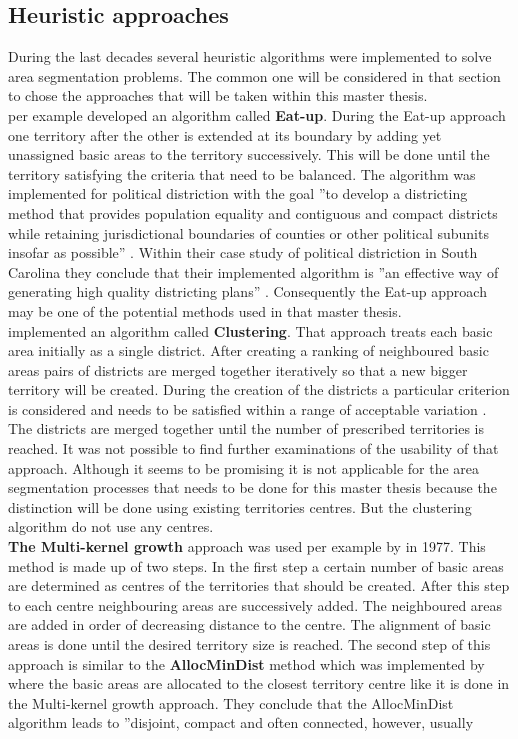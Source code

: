 \subsection{Heuristic approaches}
During the last decades several heuristic algorithms were implemented to solve area segmentation problems. The common one will be considered in that section to chose the approaches that will be taken within this master thesis. \\
\citeauthor{mehrotra} \cite{mehrotra} per example developed an algorithm called \textbf{Eat-up}. During the Eat-up approach one territory after the other is extended at its boundary by adding yet unassigned basic areas to the territory successively. This will be done until the territory satisfying the criteria that need to be balanced. The algorithm was implemented for political distriction with the goal ''to develop a districting method that provides population equality and contiguous and compact districts while retaining jurisdictional boundaries of counties or other political subunits insofar as possible'' \cite{mehrotra}. Within their case study of political distriction in South Carolina they conclude that their implemented algorithm is ''an effective way of generating high quality districting plans'' \cite{mehrotra}. Consequently the Eat-up approach may be one of the potential methods used in that master thesis.\\
\citeauthor{deckro} \cite{deckro} implemented an algorithm called \textbf{Clustering}. That approach treats each basic area initially as a single district. After creating a ranking of neighboured basic areas pairs of districts are merged together iteratively so that a new bigger territory will be created. During the creation of the districts a particular criterion is considered and needs to be satisfied within a range of acceptable variation \cite{deckro}. The districts are merged together until the number of prescribed territories is reached. It was not possible to find further examinations of the usability of that approach. Although it seems to be promising it is not applicable for the area segmentation processes that needs to be done for this master thesis because the distinction will be done using existing territories centres. But the clustering algorithm do not use any centres. \\
\textbf{The Multi-kernel growth} approach was used per example by \citeauthor{bodin}\cite{bodin} in 1977. This method is made up of two steps. In the first step a certain number of basic areas are determined as centres of the territories that should be created. After this step to each centre neighbouring areas are successively added. The neighboured areas are added in order of decreasing distance to the centre. The alignment of basic areas is done until the desired territory size is reached. The second step of this approach is similar to the \textbf{AllocMinDist} method which was implemented by \citeauthor{kalcsics2} \cite{kalcsics2} where the basic areas are allocated to the closest territory centre like it is done in the Multi-kernel growth approach. They conclude that the AllocMinDist algorithm leads to ''disjoint, compact and often connected, however, usually
